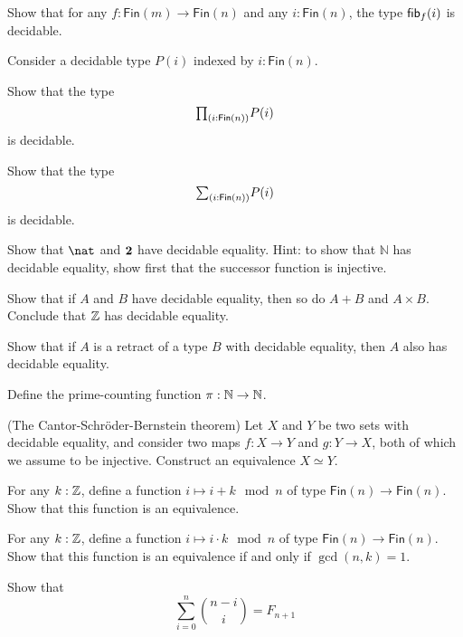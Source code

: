 \begin{exercises}
\item Show that for any $f:\mathsf{Fin}(m)\to\mathsf{Fin}(n)$ and any $i:\mathsf{Fin}(n)$, the type $\mathsf{fib}_{f}(i)$ is decidable.
\item Consider a decidable type $P(i)$ indexed by $i:\mathsf{Fin}(n)$.
  \begin{subexenum}
  \item Show that the type
    \begin{equation*}
      \prd{i:\mathsf{Fin}(n)}P(i)
    \end{equation*}
    is decidable.
  \item Show that the type
    \begin{equation*}
      \sm{i:\mathsf{Fin}(n)}P(i)
    \end{equation*}
    is decidable.
  \end{subexenum}
\item
  \begin{subexenum}
  \item Show that $\nat$ and $\mathbf{2}$ have decidable equality. Hint: to show that $\mathbb{N}$ has decidable equality, show first that the successor function is injective.
  \item Show that if $A$ and $B$ have decidable equality, then so do $A+B$ and $A\times B$. Conclude that ${\mathbb{Z}}$ has decidable equality.
  \item Show that if $A$ is a retract of a type $B$ with decidable equality, then $A$ also has decidable equality.
  \end{subexenum}
\item Define the prime-counting function $\pi:{\mathbb{N}}\to{\mathbb{N}}$.
\item (The Cantor-Schr\"oder-Bernstein theorem) Let $X$ and $Y$ be two sets with decidable equality, and consider two maps $f:X\to Y$ and $g:Y\to X$, both of which we assume to be injective. Construct an equivalence $X\simeq Y$.
\item For any $k:{\mathbb{Z}}$, define a function $i\mapsto i+k \mod n$ of type $\mathsf{Fin}(n)\to\mathsf{Fin}(n)$. Show that this function is an equivalence.
\item For any $k:{\mathbb{Z}}$, define a function $i\mapsto i\cdot k \mod n$ of type $\mathsf{Fin}(n)\to\mathsf{Fin}(n)$. Show that this function is an equivalence if and only if $\gcd(n,k)=1$.
\item Show that
  \begin{equation*}
    \sum_{i=0}^n \binom{n-i}{i}=F_{n+1}
  \end{equation*}
\end{exercises}
